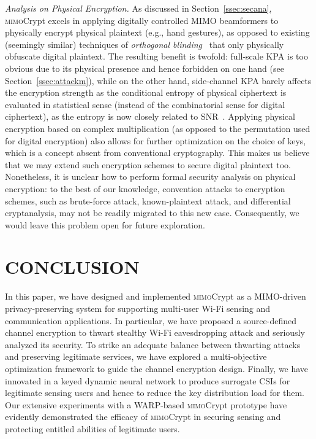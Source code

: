 \documentclass[conference,compsoc]{IEEEtran}
\newcommand{\name}{\textsc{mimo}Crypt\xspace}
\newcommand{\sname}{\textsc{mimo}Crypt\xspace}
\newcommand{\newrev}[1]{{\color{blue}#1}}    %
\newcommand{\newrev}[1]{#1}
\begin{document}
\vspace{.5ex}
\newrev{
\noindent\emph{Analysis on Physical Encryption.}
%
As discussed in Section~\ref{ssec:secana}, \name excels in applying digitally controlled MIMO beamformers to physically encrypt physical plaintext (e.g., hand gestures), as opposed to existing (seemingly similar) techniques of \textit{orthogonal blinding}~\cite{Strobe, KPA-NDSS14, Robin} that only physically obfuscate digital plaintext. The resulting benefit is twofold: full-scale KPA is too obvious due to its physical presence and hence forbidden on one hand (see Section~\ref{ssec:attackm}), while on the other hand, side-channel KPA barely affects the encryption strength as the conditional entropy of physical ciphertext is evaluated in statistical sense (instead of the combinatorial sense for digital ciphertext), as the entropy is now closely related to SNR~\cite{SIG-018,entroy-snr}. Applying physical encryption based on complex multiplication (as opposed to the permutation used for digital encryption) also allows for further optimization on the choice of keys, which is a concept absent from conventional cryptography. This makes us believe that we may extend such encryption schemes to secure digital plaintext too. Nonetheless, it is unclear how to perform formal security analysis on physical encryption: to the best of our knowledge, convention attacks to encryption schemes, such as brute-force attack, known-plaintext attack, and differential cryptanalysis, may not be readily migrated to this new case. Consequently, we would leave this problem open for future exploration.
}





\section{\MakeUppercase{Conclusion}} \label{sec:conclusion}
%
In this paper, we have designed and implemented \sname as a MIMO-driven privacy-preserving system for supporting multi-user Wi-Fi sensing and communication applications. In particular, \newrev{we have proposed a source-defined channel encryption to thwart stealthy Wi-Fi eavesdropping attack
and seriously analyzed its security. To strike an adequate balance between thwarting attacks and preserving legitimate services}, we have explored a multi-objective optimization framework to guide the channel encryption design. Finally, we have innovated in a keyed dynamic neural network to produce surrogate CSIs for legitimate sensing users and hence to reduce the key distribution load for them. Our extensive experiments with a WARP-based \sname prototype have evidently demonstrated the efficacy of \sname in securing sensing and protecting entitled abilities of legitimate users.
\end{document}
